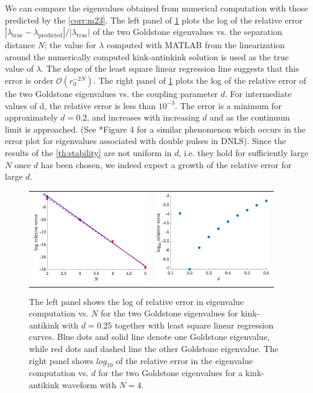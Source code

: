 \documentclass[12pt,reqno]{amsart}
\begin{document}
We can compare the eigenvalues obtained from numerical computation with those predicted by the \cref{corr:m23}. The left panel of \cref{fig:kakeigerror} plots the log of the relative error $| \lambda_{\text{true}} - \lambda_{\text{predicted}} |/| \lambda_{\text{true}} |$
of the two Goldstone eigenvalues vs. the separation distance $N$; the value for $\lambda$ computed with MATLAB from the linearization
around the numerically computed kink-antinkink solution is used as the true value of $\lambda$.
The slope of the least square linear regression line suggests that this error is order $\mathcal{O}(r_0^{-2N})$. 
The right panel of \cref{fig:kakeigerror} plots the log of the relative error of the two Goldstone eigenvalues vs. the coupling parameter $d$. For intermediate values of d, the relative error is less than $10^{-3}$. The error is a minimum for approximately $d = 0.2$, and increases with increasing $d$ and as the
continuum limit is approached. (See \cite{Parker2020}*{Figure 4} for a similar phenomenon which occurs in the error plot for eigenvalues associated with double pulses in DNLS). Since the results of the \cref{th:stability} are not uniform in $d$, i.e. they hold for sufficiently large $N$ once $d$ has been chosen, we 
indeed expect a growth of the relative error for large $d$.

\begin{figure}
	\begin{center}
	\begin{tabular}{cc}
	\includegraphics[width=5cm]{goldstoned025relerror.eps} &
	\includegraphics[width=5cm]{goldstoneN4relativeerror.eps}
	\end{tabular}
	\end{center}
	\caption{The left panel shows the log of relative error in eigenvalue computation vs. $N$ for the two Goldstone eigenvalues for kink-antikink with $d = 0.25$ together with least square linear regression curves. Blue dots and solid line denote one Goldstone eigenvalue, while red dots and dashed line the other Goldstone eigenvalue. The right panel shows $log_{10}$ of the relative error in the eigenvalue computation vs. $d$ for the two Goldstone eigenvalues for a kink-antikink waveform
	with $N = 4$.} 
	\label{fig:kakeigerror}
\end{figure}
\end{document}
